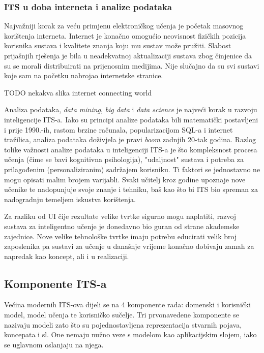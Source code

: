 \documentclass[times, utf8, zavrsni]{fer}
\begin{document}
\subsubsection{ITS u doba interneta i analize podataka}
Najvažniji korak za veću primjenu elektroničkog učenja je početak masovnog korištenja interneta. Internet je konačno omogućio neovisnost fizičkih pozicija korisnika sustava i kvalitete znanja koju mu sustav može pružiti. Slabost prijašnjih rješenja je bila u neadekvatnoj aktualizaciji sustava zbog činjenice da su se morali distribuirati na prijenosnim medijima. Nije slučajno da su svi sustavi koje sam na početku nabrojao internetske stranice.
\par  TODO nekakva slika internet connecting world
\par
Analiza podataka, \textit{data mining}, \textit{big data} i \textit{data science} je najveći korak u razvoju inteligencije ITS-a. Iako su principi analize podataka bili matematički postavljeni i prije 1990.-ih, rastom brzine računala, popularizacijom SQL-a i internet tražilica, analiza podataka doživjela je pravi \textit{boom} zadnjih 20-tak godina. Razlog tolike važnosti analize podataka u inteligenciji ITS-a je što kompleksnost procesa učenja (čime se bavi kognitivna psihologija), "udaljnost" sustava i potreba za prilagođenim (personaliziranim) sadržajem korisniku. Ti faktori se jednostavno ne mogu opisati malim brojem varijabli. Svaki učitelj kroz godine upoznaje nove učenike te nadopunjuje svoje znanje i tehniku, baš kao što bi ITS bio spreman za nadogradnju temeljem iskustva korištenja.
\par
Za razliku od UI čije rezultate velike tvrtke sigurno mogu naplatiti, razvoj sustava za inteligentno učenje je donedavno bio guran od strane akademske zajednice. Nove velike tehnološke tvrtke imaju potrebu educirati velik broj zaposlenika pa sustavi za učenje u današnje vrijeme konačno dobivaju zamah za napredak kao koncept, ali i u realizaciji.

\pagebreak

\subsection{Komponente ITS-a}
Većina modernih ITS-ova dijeli se na 4 komponente rada: domenski i korisnički model, model učenja te korisničko sučelje. Tri prvonavedene komponente se nazivaju modeli zato što su pojednostavljena reprezentacija stvarnih pojava, koncepata i sl. One nemaju nužno veze s modelom kao aplikacijskim slojem, iako se uglavnom oslanjaju na njega.
\end{document}
